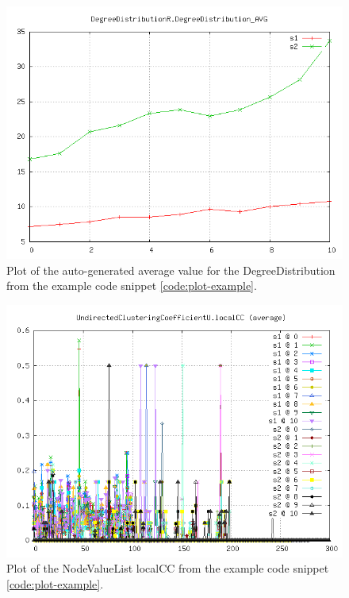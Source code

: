 \begin{figure} [h]
\centering
\includegraphics [scale=0.8] {images/plot_dist_avg}
\caption{Plot of the auto-generated average value for the DegreeDistribution from the example code snippet \ref{code:plot-example}.}
\label{fig:plot_dist_avg}
\end{figure}

\begin{figure} [h]
\centering
\includegraphics [scale=0.8] {images/plot_nvl}
\caption{Plot of the NodeValueList localCC from the example code snippet \ref{code:plot-example}.}
\label{fig:plot_nvl}
\end{figure}

